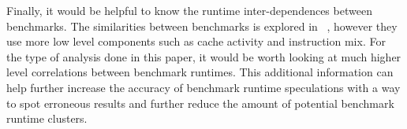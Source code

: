 \documentclass[10pt,twocolumn,letterpaper]{article}
\begin{document}
Finally, it would be helpful to know the runtime inter-dependences between benchmarks.
The similarities between benchmarks is explored in ~\cite{SPEC_Anal}, however they use more low level components such as cache activity and instruction mix.
For the type of analysis done in this paper, it would be worth looking at much higher level correlations between benchmark runtimes.
This additional information can help further increase the accuracy of benchmark runtime speculations with a way to spot erroneous results and further reduce the amount of potential benchmark runtime clusters.


{\small


}
\end{document}
